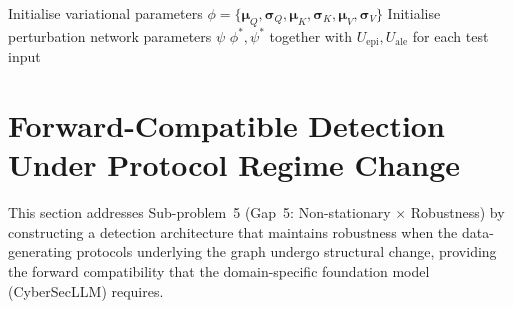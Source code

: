 \begin{algorithm}[htbp]
\caption{Stochastic Transformer: Variational Bayesian Training with Adversarial Robustness}\label{alg:stoch_trans}
Initialise variational parameters $\phi = \{\bm{\mu}_Q,\bm{\sigma}_Q,\bm{\mu}_K,\bm{\sigma}_K,\bm{\mu}_V,\bm{\sigma}_V\}$\;
Initialise perturbation network parameters $\psi$\;
\Return $\phi^*,\psi^*$ together with $U_{\mathrm{epi}},U_{\mathrm{ale}}$ for each test input
\end{algorithm}


\section{Forward-Compatible Detection Under Protocol Regime Change}
\label{sec:pq_idps}

This section addresses Sub-problem~5 (Gap~5: Non-stationary $\times$ Robustness) by constructing a detection architecture that maintains robustness when the data-generating protocols underlying the graph undergo structural change, providing the forward compatibility that the domain-specific foundation model (CyberSecLLM) requires.


